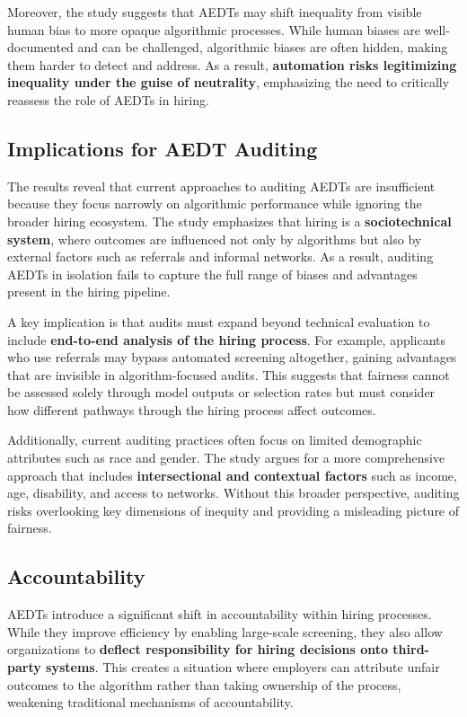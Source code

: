 Moreover, the study suggests that AEDTs may shift inequality from visible human bias to more opaque algorithmic processes. While human biases are well-documented and can be challenged, algorithmic biases are often hidden, making them harder to detect and address. As a result, \textbf{automation risks legitimizing inequality under the guise of neutrality}, emphasizing the need to critically reassess the role of AEDTs in hiring.

\subsection{Implications for AEDT Auditing}
The results reveal that current approaches to auditing AEDTs are insufficient because they focus narrowly on algorithmic performance while ignoring the broader hiring ecosystem. The study emphasizes that hiring is a \textbf{sociotechnical system}, where outcomes are influenced not only by algorithms but also by external factors such as referrals and informal networks. As a result, auditing AEDTs in isolation fails to capture the full range of biases and advantages present in the hiring pipeline.

A key implication is that audits must expand beyond technical evaluation to include \textbf{end-to-end analysis of the hiring process}. For example, applicants who use referrals may bypass automated screening altogether, gaining advantages that are invisible in algorithm-focused audits. This suggests that fairness cannot be assessed solely through model outputs or selection rates but must consider how different pathways through the hiring process affect outcomes.

Additionally, current auditing practices often focus on limited demographic attributes such as race and gender. The study argues for a more comprehensive approach that includes \textbf{intersectional and contextual factors} such as income, age, disability, and access to networks. Without this broader perspective, auditing risks overlooking key dimensions of inequity and providing a misleading picture of fairness.

\subsection{Accountability}
AEDTs introduce a significant shift in accountability within hiring processes. While they improve efficiency by enabling large-scale screening, they also allow organizations to \textbf{deflect responsibility for hiring decisions onto third-party systems}. This creates a situation where employers can attribute unfair outcomes to the algorithm rather than taking ownership of the process, weakening traditional mechanisms of accountability.


